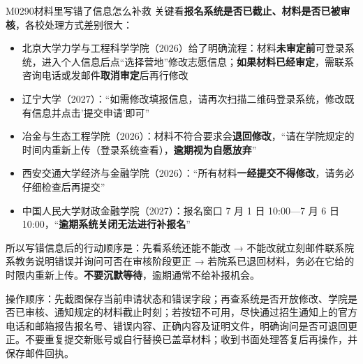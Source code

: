 \begin{qa}{M0290}{材料里写错了信息怎么补救}
关键看\textbf{报名系统是否已截止、材料是否已被审核}，各校处理方式差别很大：

\begin{itemize}
  \item 北京大学力学与工程科学学院（2026）给了明确流程：材料\textbf{未审定前}可登录系统，进入个人信息后点“选择营地”修改志愿信息；\textbf{如果材料已经审定}，需联系咨询电话或发邮件\textbf{取消审定}后再行修改
  \item 辽宁大学（2027）：“如需修改填报信息，请再次扫描二维码登录系统，修改既有信息并点击'提交申请'即可”
  \item 冶金与生态工程学院（2026）：材料不符合要求会\textbf{退回修改}，“请在学院规定的时间内重新上传（登录系统查看），\textbf{逾期视为自愿放弃}”
  \item 西安交通大学经济与金融学院（2026）：“所有材料\textbf{一经提交不得修改}，请务必仔细检查后再提交”
  \item 中国人民大学财政金融学院（2027）：报名窗口 7 月 1 日 10:00—7 月 6 日 10:00，“\textbf{逾期系统关闭无法进行补报名}”
\end{itemize}

所以写错信息后的行动顺序是：先看系统还能不能改 → 不能改就立刻邮件联系院系教务说明错误并询问可否在审核阶段更正 → 若院系已退回材料，务必在它给的时限内重新上传。\textbf{不要沉默等待}，逾期通常不给补报机会。

操作顺序：先截图保存当前申请状态和错误字段；再查系统是否开放修改、学院是否已审核、通知规定的材料截止时刻；若按钮不可用，尽快通过招生通知上的官方电话和邮箱报告报名号、错误内容、正确内容及证明文件，明确询问是否可退回更正。不要重复提交新账号或自行替换已盖章材料；收到书面处理答复后再操作，并保存邮件回执。
\end{qa}

